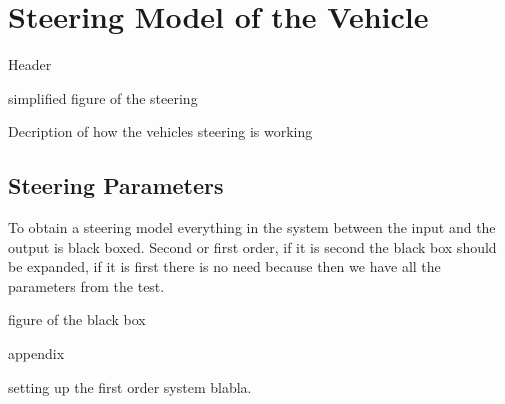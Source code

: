 \section{Steering Model of the Vehicle}
Header

simplified figure of the steering

Decription of how the vehicles steering is working

\subsection{Steering Parameters}
 To obtain a steering model everything in the system between the input and the output is black boxed. Second or first order, if it is second the black box should be expanded, if it is first there is no need because then we have all the parameters from the test.
 
 figure of the black box
 
 appendix
 
setting up the first order system blabla. 

